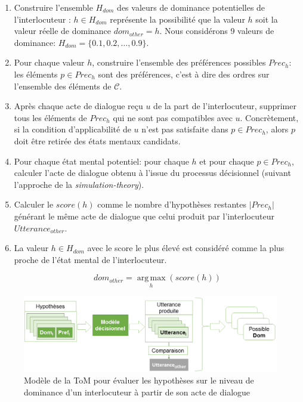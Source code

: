 \begin{enumerate}
	
	\item Construire l'ensemble $H_{dom}$ des  valeurs de dominance potentielles de l'interlocuteur : $h\in H_{dom}$ représente la possibilité que la valeur $h$ soit la valeur réelle de dominance $dom_{other}=h$. Nous considérons 9 valeurs de dominance: $H_{dom}=\{0.1, 0.2, \ldots, 0.9\}$.
	
	\item Pour chaque valeur $h$, construire l'ensemble des préférences possibles $Prec_h$: les éléments $p\in Prec_h$ sont des préférences, c'est à dire des ordres sur l'ensemble des éléments de $\mathcal{C}$.
	
	\item Après chaque acte de dialogue reçu $u$ de la part de l'interlocuteur, supprimer tous les éléments de $Prec_h$ qui ne sont pas compatibles avec $u$. Concrètement, si la condition d'applicabilité de $u$ n'est pas satisfaite dans $p \in Prec_h$, alors $p$ doit être retirée des états mentaux candidats.
	
	\item Pour chaque état mental potentiel: pour chaque $h$ et pour chaque $p \in  Prec_h$,  calculer l'acte de dialogue obtenu à l'issue du processus décisionnel (suivant l'approche de la \emph{simulation-theory}).
	
	\item Calculer le $score(h)$ comme le nombre d'hypothèses restantes $|Prec_h|$ générant le même acte de dialogue que celui produit par l'interlocuteur $Utterance_{other}$. 
	
	\item La valeur $h \in H_{dom}$ avec le score le plus élevé est considéré comme la plus proche de l'état mental de l'interlocuteur.

	$$dom_{other} = \operatorname*{arg\,max}_{h} (score(h))$$
\end{enumerate}

	\begin{figure}
		\centering
		\includegraphics[width=\linewidth]{Figures/chap5/model/tom_select.PNG}
		\caption{Modèle de la ToM pour évaluer les hypothèses sur le niveau de dominance d'un interlocuteur à partir de son acte de dialogue} 
		\label{fig:tom}
	\end{figure} 
	
